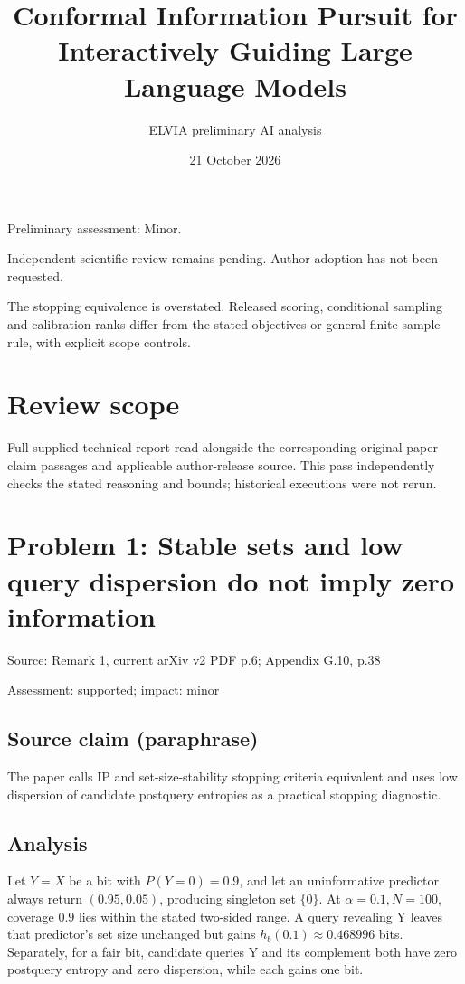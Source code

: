\documentclass[11pt]{article}
\begin{document}
\title{Conformal Information Pursuit for Interactively Guiding Large Language Models}

\author{ELVIA preliminary AI analysis}\date{21 October 2026}\maketitle

Preliminary assessment: Minor.\par

Independent scientific review remains pending. Author adoption has not been requested.

The stopping equivalence is overstated. Released scoring, conditional sampling and calibration ranks differ from the stated objectives or general finite-sample rule, with explicit scope controls.

\section*{Review scope}

Full supplied technical report read alongside the corresponding original-paper claim passages and applicable author-release source. This pass independently checks the stated reasoning and bounds; historical executions were not rerun.

\section*{Problem 1: Stable sets and low query dispersion do not imply zero information}

Source: Remark 1, current arXiv v2 PDF p.6; Appendix G.10, p.38

Assessment: supported; impact: minor

\subsection*{Source claim (paraphrase)}

The paper calls IP and set-size-stability stopping criteria equivalent and uses low dispersion of candidate postquery entropies as a practical stopping diagnostic.

\subsection*{Analysis}

Let \(Y=X\) be a bit with \(P(Y=0)=0.9\), and let an uninformative predictor always return \((0.95,0.05)\), producing singleton set \(\{0\}\). At \(\alpha=0.1,N=100\), coverage \(0.9\) lies within the stated two-sided range. A query revealing Y leaves that predictor’s set size unchanged but gains \(h_b(0.1)\approx0.468996\) bits. Separately, for a fair bit, candidate queries Y and its complement both have zero postquery entropy and zero dispersion, while each gains one bit.
\end{document}
